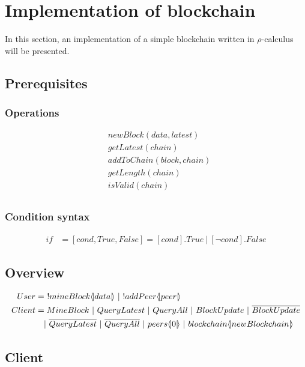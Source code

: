 \section{Implementation of blockchain}
In this section, an implementation of a simple blockchain written in $\rho$-calculus will be presented.

\subsection{Prerequisites}

\subsubsection{Operations}

\begin{align*}
    &newBlock(data,latest)\\
    &getLatest(chain)\\
    &addToChain(block,chain)\\
    &getLength(chain)\\
    &isValid(chain)\\
\end{align*}

\subsubsection{Condition syntax}

\begin{align*}
    if &= [cond,True,False] = [cond].True\ |\ [\neg cond].False
\end{align*}

\subsection{Overview}


\begin{align*}
    User &=\ !mineBlock \lift{}{data}\ |\ !addPeer\lift{}{peer}\\
    Client &= MineBlock\ |\ QueryLatest\ |\ QueryAll\ |\ BlockUpdate\ |\ \overline{BlockUpdate}\\
    &\quad |\ \overline{QueryLatest}\ |\ \overline{QueryAll}\ |\ peers\lift{}{0}\ |\ blockchain\lift{}{newBlockchain}
\end{align*}

\subsection{Client}

